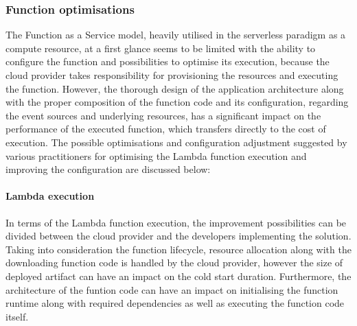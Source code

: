 \subsubsection{Function optimisations}

The Function as a Service model, heavily utilised in the serverless paradigm as a compute resource, at a first glance seems to be limited with the ability to configure the function and possibilities to optimise its execution, because the cloud provider takes responsibility for provisioning the resources and executing the function. 
However, the thorough design of the application architecture along with the proper composition of the function code and its configuration, regarding the event sources and underlying resources, has a significant impact on the performance of the executed function, which transfers directly to the cost of execution.
The possible optimisations and configuration adjustment suggested by various practitioners for optimising the Lambda function execution and improving the configuration are discussed below:

\paragraph{Lambda execution}

In terms of the Lambda function execution, the improvement possibilities can be divided between the cloud provider and the developers implementing the solution. Taking into consideration the function lifecycle, resource allocation along with the downloading function code is handled by the cloud provider, however the size of deployed artifact can have an impact on the cold start duration. Furthermore, the architecture of the funtion code can have an impact on initialising the function runtime along with required dependencies as well as executing the function code itself.

